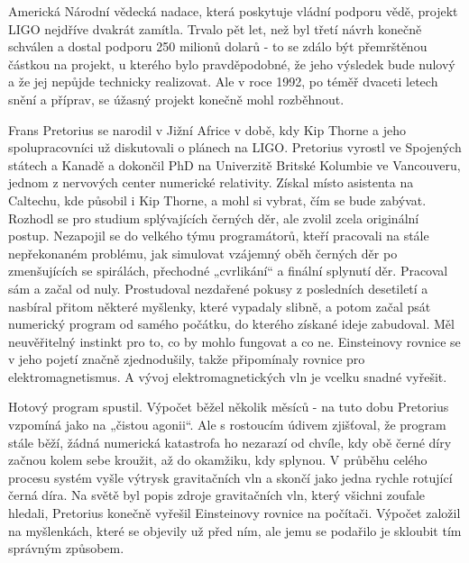   Americká Národní vědecká nadace, která poskytuje vládní podporu vědě, projekt LIGO nejdříve
  dvakrát zamítla. Trvalo pět let, než byl třetí návrh konečně schválen a dostal podporu 250 milionů
  dolarů - to se zdálo být přemrštěnou částkou na projekt, u kterého bylo pravděpodobné, že jeho
  výsledek bude nulový a že jej nepůjde technicky realizovat. Ale v roce 1992, po téměř dvaceti
  letech snění a příprav, se úžasný projekt konečně mohl rozběhnout. 

  Frans Pretorius se narodil v Jižní Africe v době, kdy Kip Thorne a jeho spolupracovníci už
  diskutovali o plánech na LIGO. Pretorius vyrostl ve Spojených státech a Kanadě a dokončil PhD na
  Univerzitě Britské Kolumbie ve Vancouveru, jednom z nervových center numerické relativity. Získal
  místo asistenta na Caltechu, kde působil i Kip Thorne, a mohl si vybrat, čím se bude zabývat.
  Rozhodl se pro studium splývajících černých děr, ale zvolil zcela originální postup. Nezapojil se
  do velkého týmu programátorů, kteří pracovali na stále nepřekonaném problému, jak simulovat
  vzájemný oběh černých děr po zmenšujících se spirálách, přechodné „cvrlikání“ a finální splynutí
  děr. Pracoval sám a začal od nuly. Prostudoval nezdařené pokusy z posledních desetiletí a nasbíral
  přitom některé myšlenky, které vypadaly slibně, a potom začal psát numerický program od samého
  počátku, do kterého získané ideje zabudoval. Měl neuvěřitelný instinkt pro to, co by mohlo
  fungovat a co ne. Einsteinovy rovnice se v jeho pojetí značně zjednodušily, takže připomínaly
  rovnice pro elektromagnetismus. A vývoj elektromagnetických vln je vcelku snadné vyřešit. 

  Hotový program spustil. Výpočet běžel několik měsíců - na tuto dobu Pretorius vzpomíná jako na
  „čistou agonii“. Ale s rostoucím údivem zjišťoval, že program stále běží, žádná numerická
  katastrofa ho nezarazí od chvíle, kdy obě černé díry začnou kolem sebe kroužit, až do okamžiku,
  kdy splynou. V průběhu celého procesu systém vyšle výtrysk gravitačních vln a skončí jako jedna
  rychle rotující černá díra. Na světě byl popis zdroje gravitačních vln, který všichni zoufale
  hledali, Pretorius konečně vyřešil Einsteinovy rovnice na počítači. Výpočet založil na myšlenkách,
  které se objevily už před ním, ale jemu se podařilo je skloubit tím správným způsobem. 

